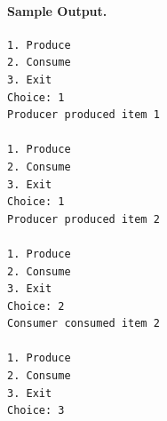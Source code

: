 

\paragraph{Sample Output.}
\begin{lstlisting}[style=terminal]
1. Produce
2. Consume
3. Exit
Choice: 1
Producer produced item 1

1. Produce
2. Consume
3. Exit
Choice: 1
Producer produced item 2

1. Produce
2. Consume
3. Exit
Choice: 2
Consumer consumed item 2

1. Produce
2. Consume
3. Exit
Choice: 3
\end{lstlisting}

